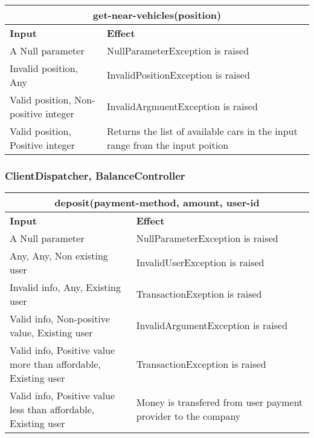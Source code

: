 \\
\begin{tabular}{|p{5cm}|p{7cm}|}
\hline
\multicolumn{2}{|c|}{get-near-vehicles(position)} \\
\hline
\textbf{Input} & \textbf{Effect} \\

\hline
A Null parameter & NullParameterException is raised \\

\hline
Invalid position, Any & InvalidPositionException is raised \\

\hline
Valid position, Non-positive integer & InvalidArgmuentException is raised \\

\hline
Valid position, Positive integer & Returns the list of available cars in the input range from the input poition \\
\hline
\end{tabular}
\subsubsection{ClientDispatcher, BalanceController}
\begin{tabular}{|p{5cm}|p{7cm}|}
\hline
\multicolumn{2}{|c|}{deposit(payment-method, amount, user-id} \\
\hline
\textbf{Input} & \textbf{Effect} \\

\hline
A Null parameter & NullParameterException is raised \\

\hline
Any, Any, Non existing user & InvalidUserException is raised \\

\hline
Invalid info, Any, Existing user & TransactionExeption is raised \\

\hline
Valid info, Non-positive value, Existing user & InvalidArgumentException is raised \\

\hline
Valid info, Positive value more than aﬀordable, Existing user & TransactionException is raised \\

\hline
Valid info, Positive value less than aﬀordable, Existing user & Money is transfered from user payment provider to the company \\
\hline
\end{tabular}
